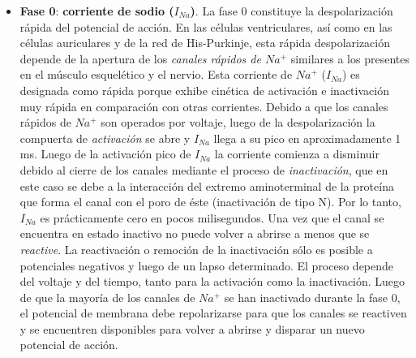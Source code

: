     \begin{itemize}
        \item \textbf{Fase 0}: \textbf{corriente de sodio ($I_{Na}$)}. La fase 0 constituye la despolarización rápida del potencial de acción. En las células ventriculares, así como en las células auriculares y de la red de His-Purkinje, esta rápida despolarización depende de la apertura de los \textit{canales rápidos de $Na^+$} similares a los presentes en el músculo esquelético y el nervio. Esta corriente de $Na^+$ ($I_{Na}$) es designada como rápida porque exhibe cinética de activación e inactivación muy rápida en comparación con otras corrientes. Debido a que los canales rápidos de $Na^+$ son operados por voltaje, luego de la despolarización la compuerta de \textit{activación} se abre y $I_{Na}$ llega a su pico en aproximadamente 1 ms. Luego de la activación pico de $I_{Na}$ la corriente comienza a disminuir debido al cierre de los canales mediante el proceso de \textit{inactivación}, que en este caso se debe a la interacción del extremo aminoterminal de la proteína que forma el canal con el poro de éste (inactivación de tipo N). Por lo tanto, $I_{Na}$ es prácticamente cero en pocos milisegundos. Una vez que el canal se encuentra en estado inactivo no puede volver a abrirse a menos que se \textit{reactive}. La reactivación o remoción de la inactivación sólo es posible a potenciales negativos y luego de un lapso determinado. El proceso depende del voltaje y del tiempo, tanto para la activación como la inactivación. Luego de que la mayoría de los canales de $Na^+$ se han inactivado durante la fase 0, el potencial de membrana debe repolarizarse para que los canales se reactiven y se encuentren disponibles para volver a abrirse y disparar un nuevo potencial de acción. \\

\end{itemize}
